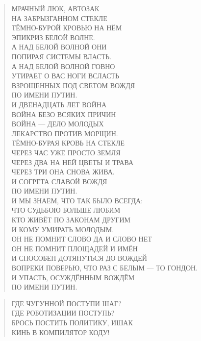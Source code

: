 \poemtitle{***}
\begin{verse}
МРАЧНЫЙ ЛЮК, АВТОЗАК\\
НА ЗАБРЫЗГАННОМ СТЕКЛЕ\\
ТЁМНО-БУРОЙ КРОВЬЮ НА НЁМ\\
ЭПИКРИЗ БЕЛОЙ ВОЛНЕ.\\
А НАД БЕЛОЙ ВОЛНОЙ ОНИ\\
ПОПИРАЯ СИСТЕМЫ ВЛАСТЬ.\\
А НАД БЕЛОЙ ВОЛНОЙ ГОВНО\\
УТИРАЕТ О ВАС НОГИ ВСЛАСТЬ\\
ВЗРОЩЕННЫХ ПОД СВЕТОМ ВОЖДЯ\\
ПО ИМЕНИ ПУТИН.\\
И ДВЕНАДЦАТЬ ЛЕТ ВОЙНА\\
ВОЙНА БЕЗО ВСЯКИХ ПРИЧИН\\
ВОЙНА — ДЕЛО МОЛОДЫХ\\
ЛЕКАРСТВО ПРОТИВ МОРЩИН.\\
ТЁМНО-БУРАЯ КРОВЬ НА СТЕКЛЕ\\
ЧЕРЕЗ ЧАС УЖЕ ПРОСТО ЗЕМЛЯ\\
ЧЕРЕЗ ДВА НА НЕЙ ЦВЕТЫ И ТРАВА\\
ЧЕРЕЗ ТРИ ОНА СНОВА ЖИВА.\\
И СОГРЕТА СЛАВОЙ ВОЖДЯ\\
ПО ИМЕНИ ПУТИН.\\
И МЫ ЗНАЕМ, ЧТО ТАК БЫЛО ВСЕГДА:\\
ЧТО СУДЬБОЮ БОЛЬШЕ ЛЮБИМ\\
КТО ЖИВЁТ ПО ЗАКОНАМ ДРУГИМ\\
И КОМУ УМИРАТЬ МОЛОДЫМ.\\
ОН НЕ ПОМНИТ СЛОВО ДА И СЛОВО НЕТ\\
ОН НЕ ПОМНИТ ПЛОЩАДЕЙ И ИМЁН\\
И СПОСОБЕН ДОТЯНУТЬСЯ ДО ВОЖДЕЙ\\
ВОПРЕКИ ПОВЕРЬЮ, ЧТО РАЗ С БЕЛЫМ — ТО ГОНДОН.\\
И УПАСТЬ, ОСУЖДЁННЫМ ВОЖДЁМ\\
ПО ИМЕНИ ПУТИН.
\end{verse}

\poemtitle{***}
\begin{verse}
ГДЕ ЧУГУННОЙ ПОСТУПИ ШАГ?\\
ГДЕ РОБОТИЗАЦИИ ПОСТУПЬ?\\
БРОСЬ ПОСТИТЬ ПОЛИТИКУ, ИШАК\\
КИНЬ В КОМПИЛЯТОР КОДУ!
\end{verse}

